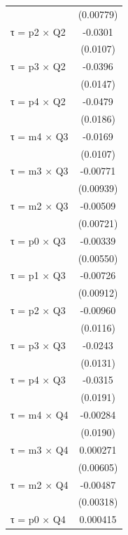 \begin{table}[htbp]
\begin{tabular}{l*{1}{c}}
                    &   (0.00779)         \\
[1em]
τ = p2 × Q2         &     -0.0301\sym{***}\\
                    &    (0.0107)         \\
[1em]
τ = p3 × Q2         &     -0.0396\sym{***}\\
                    &    (0.0147)         \\
[1em]
τ = p4 × Q2         &     -0.0479\sym{**} \\
                    &    (0.0186)         \\
[1em]
τ = m4 × Q3         &     -0.0169         \\
                    &    (0.0107)         \\
[1em]
τ = m3 × Q3         &    -0.00771         \\
                    &   (0.00939)         \\
[1em]
τ = m2 × Q3         &    -0.00509         \\
                    &   (0.00721)         \\
[1em]
τ = p0 × Q3         &    -0.00339         \\
                    &   (0.00550)         \\
[1em]
τ = p1 × Q3         &    -0.00726         \\
                    &   (0.00912)         \\
[1em]
τ = p2 × Q3         &    -0.00960         \\
                    &    (0.0116)         \\
[1em]
τ = p3 × Q3         &     -0.0243\sym{*}  \\
                    &    (0.0131)         \\
[1em]
τ = p4 × Q3         &     -0.0315         \\
                    &    (0.0191)         \\
[1em]
τ = m4 × Q4         &    -0.00284         \\
                    &    (0.0190)         \\
[1em]
τ = m3 × Q4         &    0.000271         \\
                    &   (0.00605)         \\
[1em]
τ = m2 × Q4         &    -0.00487         \\
                    &   (0.00318)         \\
[1em]
τ = p0 × Q4         &    0.000415         \\

\end{tabular}
\end{table}
